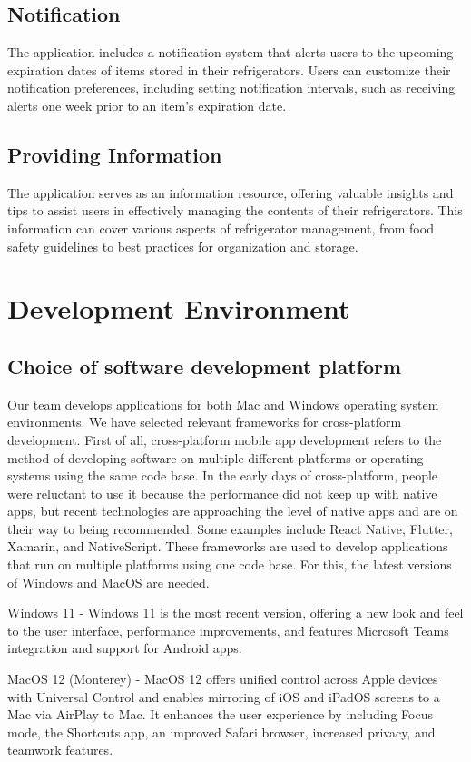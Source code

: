 \documentclass[conference]{IEEEtran}
\begin{document}
\subsection{Notification}
The application includes a notification system that alerts users to the upcoming expiration dates of items stored in their refrigerators. Users can customize their notification preferences, including setting notification intervals, such as receiving alerts one week prior to an item's expiration date.

\subsection{Providing Information}
The application serves as an information resource, offering valuable insights and tips to assist users in effectively managing the contents of their refrigerators. This information can cover various aspects of refrigerator management, from food safety guidelines to best practices for organization and storage.

\section{Development Environment}
\subsection{Choice of software development platform}
Our team develops applications for both Mac and Windows operating system environments. We have selected relevant frameworks for cross-platform development. First of all, cross-platform mobile app development refers to the method of developing software on multiple different platforms or operating systems using the same code base. In the early days of cross-platform, people were reluctant to use it because the performance did not keep up with native apps, but recent technologies are approaching the level of native apps and are on their way to being recommended.  Some examples include React Native, Flutter, Xamarin, and NativeScript. These frameworks are used to develop applications that run on multiple platforms using one code base.  For this, the latest versions of Windows and MacOS are needed.  \par
Windows 11  - Windows 11 is the most recent version, offering a new look and feel to the user interface, performance improvements, and features Microsoft Teams integration and support for Android apps. \par
MacOS 12 (Monterey)  - MacOS 12 offers unified control across Apple devices with Universal Control and enables mirroring of iOS and iPadOS screens to a Mac via AirPlay to Mac. It enhances the user experience by including Focus mode, the Shortcuts app, an improved Safari browser, increased privacy, and teamwork features.
\end{document}
